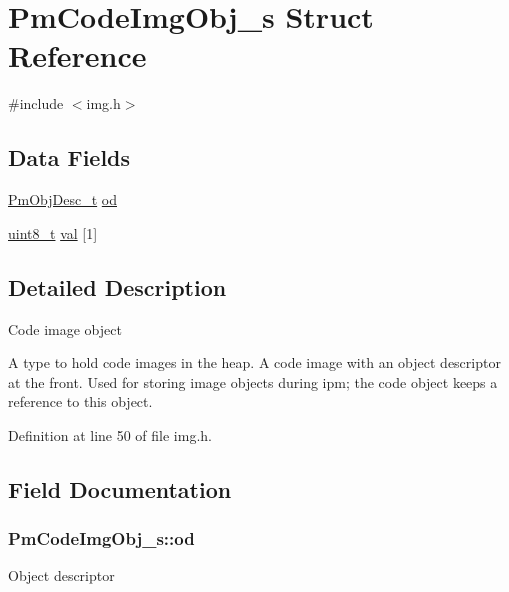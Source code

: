 \hypertarget{struct_pm_code_img_obj__s}{\section{Pm\-Code\-Img\-Obj\-\_\-s Struct Reference}
\label{struct_pm_code_img_obj__s}
}


{\ttfamily \#include $<$img.\-h$>$}

\subsection*{Data Fields}
\begin{DoxyCompactItemize}
\item 
\hyperlink{obj_8h_a72d816790acd8eb550fb25268c2b3489}{Pm\-Obj\-Desc\-\_\-t} \hyperlink{struct_pm_code_img_obj__s_a5b33683f3f42b2d61f837b4fed80ca75}{od}
\item 
\hyperlink{stdint_8h_aba7bc1797add20fe3efdf37ced1182c5}{uint8\-\_\-t} \hyperlink{struct_pm_code_img_obj__s_a9cb26fc90b348ecb2615f2b6cf196994}{val} \mbox{[}1\mbox{]}
\end{DoxyCompactItemize}


\subsection{Detailed Description}
Code image object

A type to hold code images in the heap. A code image with an object descriptor at the front. Used for storing image objects during ipm; the code object keeps a reference to this object. 

Definition at line 50 of file img.\-h.



\subsection{Field Documentation}
\hypertarget{struct_pm_code_img_obj__s_a5b33683f3f42b2d61f837b4fed80ca75}{
\subsubsection[{od}]{ Pm\-Code\-Img\-Obj\-\_\-s\-::od}}\label{struct_pm_code_img_obj__s_a5b33683f3f42b2d61f837b4fed80ca75}
Object descriptor 

